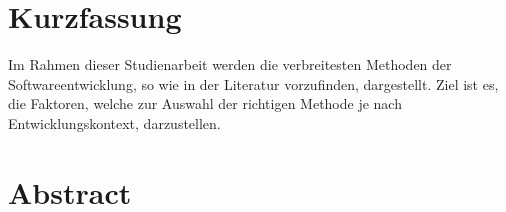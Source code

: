 
\chapter*{Kurzfassung}
\raggedright
Im Rahmen dieser Studienarbeit werden die verbreitesten Methoden der Softwareentwicklung, so wie in der Literatur vorzufinden, dargestellt. Ziel ist es, die Faktoren, welche zur Auswahl der richtigen Methode je nach Entwicklungskontext, darzustellen. 

\begingroup
\let\clearpage\relax
\chapter*{Abstract}
\endgroup
\blindtext
